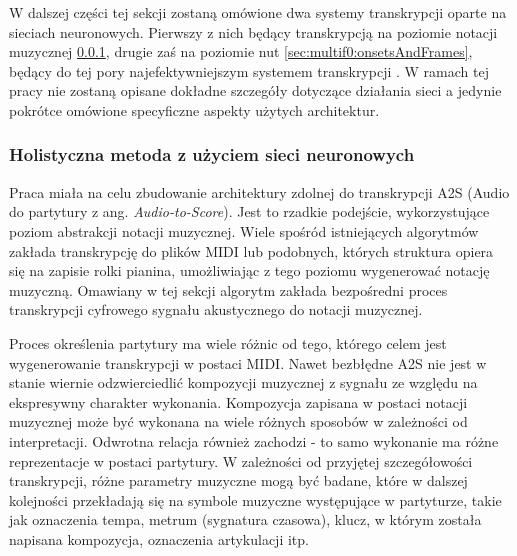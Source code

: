 \documentclass[12pt,a4paper,twoside]{mwart}
\begin{document}

W dalszej części tej sekcji zostaną omówione dwa systemy transkrypcji oparte na sieciach neuronowych. Pierwszy z nich będący transkrypcją na poziomie notacji muzycznej \ref{sec:multif0:petrusNetwork}, drugie zaś na poziomie nut \ref{sec:multif0:onsetsAndFrames}, będący do tej pory najefektywniejszym systemem transkrypcji 
\cite[27]{DBLP:journals/spm/BenetosDDE19}
. W ramach tej pracy nie zostaną opisane dokładne szczegóły dotyczące działania sieci a jedynie pokrótce omówione specyficzne aspekty użytych architektur.


\subsubsection{Holistyczna metoda z użyciem sieci neuronowych}\label{sec:multif0:petrusNetwork}
Praca \cite{Transcription:Pertus:NeuralNetwork} miała na celu zbudowanie architektury zdolnej do transkrypcji A2S (Audio do partytury z ang. \textit{Audio-to-Score}). Jest to rzadkie podejście, wykorzystujące poziom abstrakcji notacji muzycznej. Wiele spośród istniejących algorytmów zakłada transkrypcję do plików MIDI lub podobnych, których struktura opiera się na zapisie rolki pianina, umożliwiając z tego poziomu wygenerować notację muzyczną. Omawiany w tej sekcji algorytm zakłada bezpośredni proces transkrypcji cyfrowego sygnału akustycznego do notacji muzycznej.

Proces określenia partytury ma wiele różnic od tego, którego celem jest wygenerowanie transkrypcji w postaci MIDI. Nawet bezbłędne A2S nie jest w stanie wiernie odzwierciedlić kompozycji muzycznej z sygnału ze względu na ekspresywny charakter wykonania. Kompozycja zapisana w postaci notacji muzycznej może być wykonana na wiele różnych sposobów w zależności od interpretacji. Odwrotna relacja również zachodzi - to samo wykonanie ma różne reprezentacje w postaci partytury. W zależności od przyjętej szczegółowości transkrypcji, różne parametry muzyczne mogą być badane, które w dalszej kolejności przekładają się na symbole muzyczne występujące w partyturze, takie jak oznaczenia tempa, metrum (sygnatura czasowa), klucz, w którym została napisana kompozycja, oznaczenia artykulacji itp.
\end{document}
